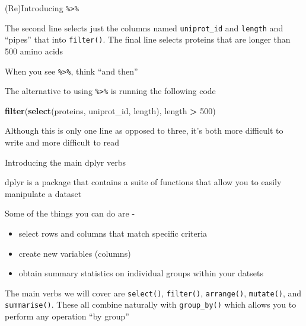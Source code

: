 \documentclass[ignorenonframetext,]{beamer}
\newenvironment{Shaded}{\begin{snugshade}}{\end{snugshade}}
\newcommand{\DecValTok}[1]{\textcolor[rgb]{0.00,0.00,0.81}{#1}}
\newcommand{\KeywordTok}[1]{\textcolor[rgb]{0.13,0.29,0.53}{\textbf{#1}}}
\newcommand{\NormalTok}[1]{#1}
\newcommand{\OperatorTok}[1]{\textcolor[rgb]{0.81,0.36,0.00}{\textbf{#1}}}
\newcommand{\StringTok}[1]{\textcolor[rgb]{0.31,0.60,0.02}{#1}}
\begin{document}
\begin{frame}[fragile]{(Re)Introducing \texttt{\%\textgreater{}\%}}
\protect\hypertarget{reintroducing-1}{}

The second line selects just the columns named \texttt{uniprot\_id} and
\texttt{length} and ``pipes'' that into \texttt{filter()}. The final
line selects proteins that are longer than 500 amino acids

When you see \texttt{\%\textgreater{}\%}, think ``and then''

The alternative to using \texttt{\%\textgreater{}\%} is running the
following code

\begin{Shaded}
\begin{Highlighting}[]
\KeywordTok{filter}\NormalTok{(}\KeywordTok{select}\NormalTok{(proteins, uniprot_id, length), length }\OperatorTok{>}\StringTok{ }\DecValTok{500}\NormalTok{)}
\end{Highlighting}
\end{Shaded}

Although this is only one line as opposed to three, it's both more
difficult to write and more difficult to read

\end{frame}

\begin{frame}[fragile]{Introducing the main dplyr verbs}
\protect\hypertarget{introducing-the-main-dplyr-verbs}{}

dplyr is a package that contains a suite of functions that allow you to
easily manipulate a dataset

Some of the things you can do are -

\begin{itemize}[<+->]
\item
  select rows and columns that match specific criteria
\item
  create new variables (columns)
\item
  obtain summary statistics on individual groups within your datsets
\end{itemize}

The main verbs we will cover are \texttt{select()}, \texttt{filter()},
\texttt{arrange()}, \texttt{mutate()}, and \texttt{summarise()}. These
all combine naturally with \texttt{group\_by()} which allows you to
perform any operation ``by group''

\end{frame}
\end{document}
